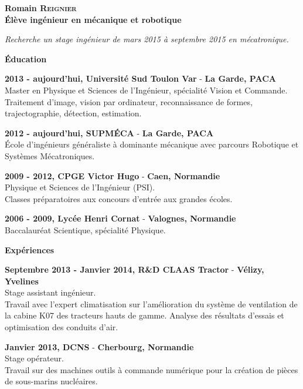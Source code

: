 \documentclass[a4paper,11pt,final]{memoir}
\newcommand{\Sep}{\vspace{1.5em}}
\newcommand{\SmallSep}{\vspace{0.5em}}
\newenvironment{AboutMe}
	{\ignorespaces%
}
	{\Sep\ignorespacesafterend}
\newcommand{\CVSection}[1]
	{\Large\textbf{#1}\par
	\SmallSep\normalsize\normalfont}
\newcommand{\CVItem}[1]
	{\textbf{\color{RoyalBlue} #1}\normalsize\normalfont}
\newcommand{\city}[1]
	{{\small\textbf{#1}}\normalsize\normalfont}
\begin{document}
\Huge\bfseries {\color{RoyalBlue} Romain \textsc{Reignier}} \\
\Large\bfseries  Élève ingénieur en mécanique et robotique\\

\normalsize\normalfont

\begin{AboutMe}
\emph{Recherche un stage ingénieur de mars 2015 à septembre 2015 en mécatronique.}
\end{AboutMe}

\CVSection{Éducation}

\CVItem{2013 - aujourd'hui, Université Sud Toulon Var} - \city{La Garde, PACA}\\
Master en Physique et Sciences de l'Ingénieur, spécialité Vision et Commande.\\
Traitement d'image, vision par ordinateur, reconnaissance de formes, trajectographie, détection, estimation.\\
\SmallSep

\CVItem{2012 - aujourd'hui, SUPMÉCA} - \city{La Garde, PACA}\\
École d'ingénieurs généraliste à dominante mécanique avec parcours Robotique et Systèmes Mécatroniques.
\SmallSep

\CVItem{2009 - 2012, CPGE Victor Hugo} - \city{Caen, Normandie}\\
Physique et Sciences de l'Ingénieur (PSI).\\
Classes préparatoires aux concours d'entrée aux grandes écoles.
\SmallSep

\CVItem{2006 - 2009, Lycée Henri Cornat} - \city{Valognes, Normandie}\\
Baccalauréat Scientique, spécialité Physique.
\Sep

\CVSection{Expériences}
\CVItem{Septembre 2013 - Janvier 2014, R\&D CLAAS Tractor} - \city{Vélizy, Yvelines}\\
Stage assistant ingénieur.\\
Travail avec l'expert climatisation sur l'amélioration du système de ventilation de la cabine K07 des tracteurs hauts de gamme.
Analyse des résultats d'essais et optimisation des conduits d'air.
\SmallSep

\CVItem{Janvier 2013, DCNS} - \city{Cherbourg, Normandie}\\
Stage opérateur.\\
Travail sur des machines outils à commande numérique pour la création de pièces de sous-marins nucléaires.
\SmallSep
\end{document}
